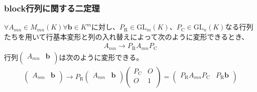 \documentclass[dvipdfmx]{jsarticle}
\begin{document}
\subsubsection{block行列に関する二定理}%
\begin{thm}\label{2.1.8.1}
$\forall A_{mn} \in M_{mn}(K)\forall\mathbf{b} \in K^{m}$に対し、$P_{\mathrm{R}} \in {\mathrm{GL}}_{m}(K)$、$P_{\mathrm{C}} \in {\mathrm{GL}}_{n}(K)$なる行列たちを用いて行基本変形と列の入れ替えによって次のように変形できるとき、
\begin{align*}
A_{mn} \rightarrow P_{\mathrm{R}}A_{mn}P_{\mathrm{C}}
\end{align*}
行列$\begin{pmatrix}
A_{mn} & \mathbf{b} \\
\end{pmatrix}$は次のように変形できる。
\begin{align*}
\begin{pmatrix}
A_{mn} & \mathbf{b} \\
\end{pmatrix} \rightarrow P_{\mathrm{R}}\begin{pmatrix}
A_{mn} & \mathbf{b} \\
\end{pmatrix}\begin{pmatrix}
P_{\mathrm{C}} & O \\
O & 1 \\
\end{pmatrix} = \begin{pmatrix}
P_{\mathrm{R}}A_{mn}P_{\mathrm{C}} & P_{\mathrm{R}}\mathbf{b} \\
\end{pmatrix}
\end{align*}
\end{thm}
\end{document}
